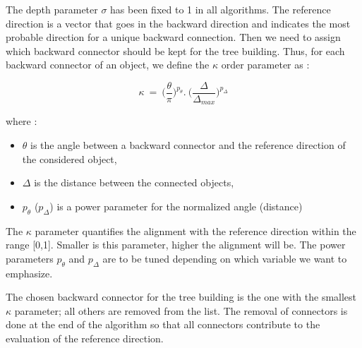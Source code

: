 \documentclass[cits]{JINST}
\begin{document}
The depth parameter $\sigma$ has been fixed to 1 in all algorithms. The reference direction is a vector that goes in the backward direction and indicates the most probable direction for a unique backward connection. Then we need to assign which backward connector should be kept for the tree building. Thus, for each backward connector of an object, we define the $\kappa$ order parameter as :

\begin{equation}
  \kappa~=~\Big(\frac{\theta}{\pi}\Big)^{p_{\theta}} . ~\Big(\frac{\Delta}{\Delta_{max}}\Big)^{p_{\Delta}} 
\end{equation}

where :

\begin{itemize}
  \item $\theta$ is the angle between a backward connector and the reference direction of the considered object,
  \item $\Delta$ is the distance between the connected objects,
  \item $p_{\theta}$ ($p_{\Delta}$) is a power parameter for the normalized angle (distance)
\end{itemize}

The $\kappa$ parameter quantifies the alignment with the reference direction within the range [0,1]. Smaller is this parameter, higher the alignment will be. The power parameters $p_{\theta}$ and $p_{\Delta}$ are to be tuned depending on which variable we want to emphasize.

The chosen backward connector for the tree building is the one with the smallest $\kappa$ parameter; all others are removed from the list. The removal of connectors is done at the end of the algorithm so that all connectors contribute to the evaluation of the reference direction.
\end{document}
